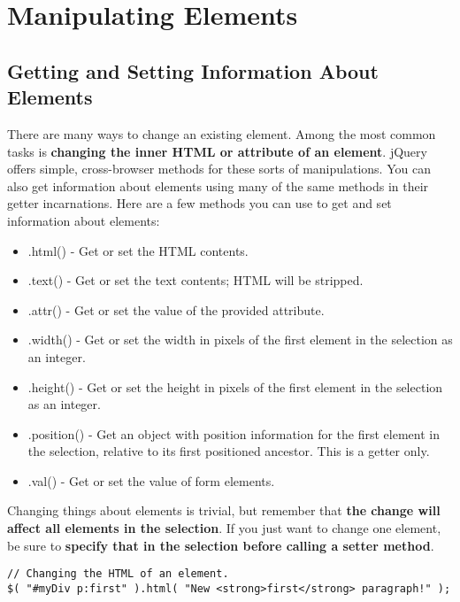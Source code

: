 \documentclass[10pt,letterpaper]{book}
\begin{document}
\section{Manipulating Elements}
\subsection{Getting and Setting Information About Elements}

There are many ways to change an existing element. Among the most common tasks is \textbf{changing the inner HTML or attribute of an element}. jQuery offers simple, cross-browser methods for these sorts of manipulations. You can also get information about elements using many of the same methods in their getter incarnations. Here are a few methods you can use to get and set information about elements:
\begin{itemize}
\item .html() - Get or set the HTML contents.
\item .text() - Get or set the text contents; HTML will be stripped.
\item .attr() - Get or set the value of the provided attribute.
\item .width() - Get or set the width in pixels of the first element in the selection as an integer.
\item .height() - Get or set the height in pixels of the first element in the selection as an integer.
\item .position() - Get an object with position information for the first element in the selection, relative to its first positioned ancestor. This is a getter only.
\item .val() - Get or set the value of form elements.
\end{itemize}
  
Changing things about elements is trivial, but remember that \textbf{the change will affect all elements in the selection}. If you just want to change one element, be sure to \textbf{specify that in the selection before calling a setter method}.
\begin{lstlisting}
// Changing the HTML of an element.
$( "#myDiv p:first" ).html( "New <strong>first</strong> paragraph!" );
\end{lstlisting}
\end{document}
